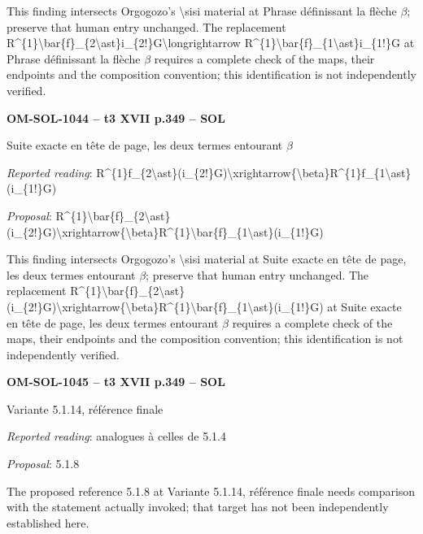 This finding intersects Orgogozo's \textbackslash{}sisi material at Phrase définissant la flèche \ensuremath{\beta}; preserve that human entry unchanged. The replacement R\textasciicircum{}\{1\}\textbackslash{}bar\{f\}\_\{2\textbackslash{}ast\}i\_\{2!\}G\textbackslash{}longrightarrow R\textasciicircum{}\{1\}\textbackslash{}bar\{f\}\_\{1\textbackslash{}ast\}i\_\{1!\}G at Phrase définissant la flèche \ensuremath{\beta} requires a complete check of the maps, their endpoints and the composition convention; this identification is not independently verified.\par
\par\noindent\textbf{OM-SOL-1044 -- t3 XVII p.349 -- SOL}\par
Suite exacte en tête de page, les deux termes entourant \ensuremath{\beta}\par
\emph{Reported reading}: R\textasciicircum{}\{1\}f\_\{2\textbackslash{}ast\}(i\_\{2!\}G)\textbackslash{}xrightarrow\{\textbackslash{}beta\}R\textasciicircum{}\{1\}f\_\{1\textbackslash{}ast\}(i\_\{1!\}G)\par
\emph{Proposal}: R\textasciicircum{}\{1\}\textbackslash{}bar\{f\}\_\{2\textbackslash{}ast\}(i\_\{2!\}G)\textbackslash{}xrightarrow\{\textbackslash{}beta\}R\textasciicircum{}\{1\}\textbackslash{}bar\{f\}\_\{1\textbackslash{}ast\}(i\_\{1!\}G)\par
This finding intersects Orgogozo's \textbackslash{}sisi material at Suite exacte en tête de page, les deux termes entourant \ensuremath{\beta}; preserve that human entry unchanged. The replacement R\textasciicircum{}\{1\}\textbackslash{}bar\{f\}\_\{2\textbackslash{}ast\}(i\_\{2!\}G)\textbackslash{}xrightarrow\{\textbackslash{}beta\}R\textasciicircum{}\{1\}\textbackslash{}bar\{f\}\_\{1\textbackslash{}ast\}(i\_\{1!\}G) at Suite exacte en tête de page, les deux termes entourant \ensuremath{\beta} requires a complete check of the maps, their endpoints and the composition convention; this identification is not independently verified.\par
\par\noindent\textbf{OM-SOL-1045 -- t3 XVII p.349 -- SOL}\par
Variante 5.1.14, référence finale\par
\emph{Reported reading}: analogues à celles de 5.1.4\par
\emph{Proposal}: 5.1.8\par
The proposed reference 5.1.8 at Variante 5.1.14, référence finale needs comparison with the statement actually invoked; that target has not been independently established here.\par

